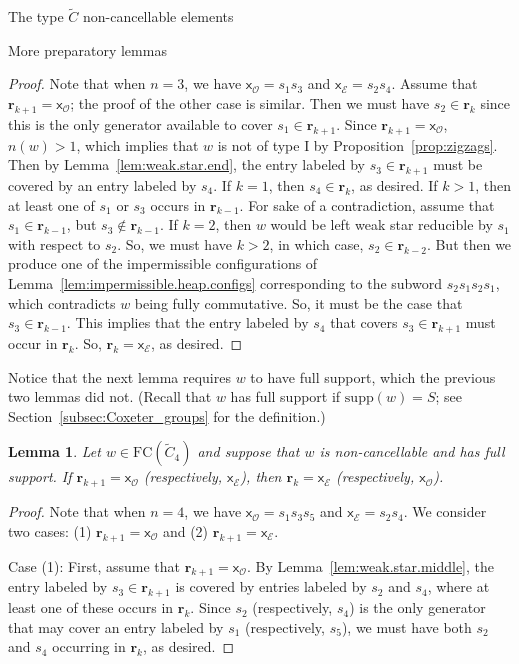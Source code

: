 \documentclass[12pt]{amsart}
\newtheorem{lem}[thm]{Lemma}
\newcommand{\C}{\widetilde{C}}
\renewcommand{\O}{\mathcal{O}}
\newcommand{\E}{\mathcal{E}}
\newcommand{\x}{\mathsf{x}}
\newcommand{\supp}{\mathrm{supp}}
\renewcommand{\(}{\left(}
\renewcommand{\)}{\right)}
\newcommand{\FC}{\mathrm{FC}}
\renewcommand{\r}{\mathbf{r}}
\begin{document}
\begin{section}{The type $\C$ non-cancellable elements}
\begin{subsection}{More preparatory lemmas}
\begin{proof}
Note that when $n=3$, we have $\x_{\O}=s_{1}s_{3}$ and $\x_{\E}=s_{2}s_{4}$.  Assume that $\r_{k+1}=\x_{\O}$; the proof of the other case is similar.  Then we must have $s_{2} \in \r_{k}$ since this is the only generator available to cover $s_{1} \in \r_{k+1}$.  Since $\r_{k+1}=\x_{\O}$, $n(w)>1$, which implies that $w$ is not of type I by Proposition~\ref{prop:zigzags}.  Then by Lemma~\ref{lem:weak.star.end}, the entry labeled by $s_{3} \in \r_{k+1}$ must be covered by an entry labeled by $s_{4}$.  If $k=1$, then $s_{4} \in \r_{k}$, as desired.  If $k>1$, then at least one of $s_{1}$ or $s_{3}$ occurs in $\r_{k-1}$.  For sake of a contradiction, assume that $s_{1} \in \r_{k-1}$, but $s_{3} \notin \r_{k-1}$.  If $k=2$, then $w$ would be left weak star reducible by $s_{1}$ with respect to $s_{2}$.  So, we must have $k>2$, in which case, $s_{2} \in \r_{k-2}$.  But then we produce one of the impermissible configurations of Lemma~\ref{lem:impermissible.heap.configs} corresponding to the subword $s_{2}s_{1}s_{2}s_{1}$, which contradicts $w$ being fully commutative.  So, it must be the case that  $s_{3} \in \r_{k-1}$.  This implies that the entry labeled by $s_{4}$ that covers $s_{3} \in \r_{k+1}$ must occur in $\r_{k}$.  So, $\r_{k}=\x_{\E}$, as desired.
\end{proof}

Notice that the next lemma requires $w$ to have full support, which the previous two lemmas did not.  (Recall that $w$ has full support if $\supp(w)=S$; see Section~\ref{subsec:Coxeter_groups} for the definition.)

\begin{lem}\label{lem:sandwich.stack.n=4}
Let $w \in \FC(\C_{4})$ and suppose that $w$ is non-cancellable and has full support.  If $\r_{k+1}=\x_{\O}$ (respectively, $\x_{\E}$), then $\r_{k}=\x_{\E}$ (respectively, $\x_{\O}$).
\end{lem}

\begin{proof}
Note that when $n=4$, we have $\x_{\O}=s_{1}s_{3}s_{5}$ and $\x_{\E}=s_{2}s_{4}$.   We consider two cases: (1) $\r_{k+1}=\x_{\O}$ and (2) $\r_{k+1}=\x_{\E}$.

Case (1):  First, assume that $\r_{k+1}=\x_{\O}$.  By Lemma~\ref{lem:weak.star.middle}, the entry labeled by $s_{3} \in \r_{k+1}$ is covered by entries labeled by $s_{2}$ and $s_{4}$, where at least one of these occurs in $\r_{k}$.  Since $s_{2}$ (respectively, $s_{4}$) is the only generator that may cover an entry labeled by $s_{1}$ (respectively, $s_{5}$), we must have both $s_{2}$ and $s_{4}$ occurring in $\r_{k}$, as desired.


\end{proof}
\end{subsection}
\end{section}
\end{document}
